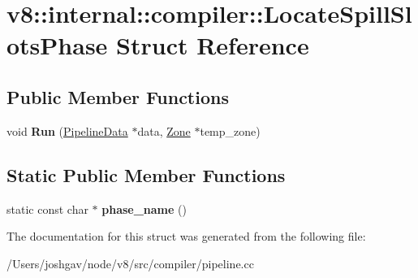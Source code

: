 \hypertarget{structv8_1_1internal_1_1compiler_1_1_locate_spill_slots_phase}{}\section{v8\+:\+:internal\+:\+:compiler\+:\+:Locate\+Spill\+Slots\+Phase Struct Reference}
\label{structv8_1_1internal_1_1compiler_1_1_locate_spill_slots_phase}
\subsection*{Public Member Functions}
\begin{DoxyCompactItemize}
\item 
void {\bfseries Run} (\hyperlink{classv8_1_1internal_1_1compiler_1_1_pipeline_data}{Pipeline\+Data} $\ast$data, \hyperlink{classv8_1_1internal_1_1_zone}{Zone} $\ast$temp\+\_\+zone)\hypertarget{structv8_1_1internal_1_1compiler_1_1_locate_spill_slots_phase_a56ee75c7145a30b570027f85a1a22bf7}{}\label{structv8_1_1internal_1_1compiler_1_1_locate_spill_slots_phase_a56ee75c7145a30b570027f85a1a22bf7}

\end{DoxyCompactItemize}
\subsection*{Static Public Member Functions}
\begin{DoxyCompactItemize}
\item 
static const char $\ast$ {\bfseries phase\+\_\+name} ()\hypertarget{structv8_1_1internal_1_1compiler_1_1_locate_spill_slots_phase_a67ca95aeb20e3c7f383359db82aa853a}{}\label{structv8_1_1internal_1_1compiler_1_1_locate_spill_slots_phase_a67ca95aeb20e3c7f383359db82aa853a}

\end{DoxyCompactItemize}


The documentation for this struct was generated from the following file\+:\begin{DoxyCompactItemize}
\item 
/\+Users/joshgav/node/v8/src/compiler/pipeline.\+cc\end{DoxyCompactItemize}
